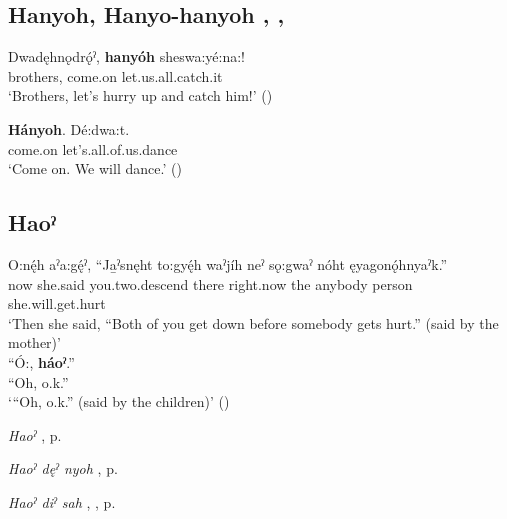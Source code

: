 \subsection*{\textbf{Hanyoh, Hanyo-hanyoh} , , } \label{p:[hanyoh]}

\ea
\label{ex:hpar100}
\gll Dwadęhnǫdrǫ́ˀ, \textbf{hanyóh} sheswa:yé:na:!\\
brothers, come.on let.us.all.catch.it\\
\glt ‘Brothers, let’s hurry up and catch him!’ (\cite{carrier_legends_2013})
\z


\ea
\label{ex:hpar2}
\gll \textbf{Hányoh}. Dé:dwa:t.\\
come.on let’s.all.of.us.dance\\
\glt ‘Come on. We will dance.’ (\cite{carrier_legends_2013})
\z


\subsection*{\textbf{Haoˀ} } \label{p:[haoˀ] ‘o.k.!’}

\ea
\label{ex:hpar3}
\gll O:nę́h aˀa:gę́ˀ, “Ja̱ˀsnęht to:gyę́h waˀjíh neˀ sǫ:gwaˀ nóht ęyagonǫ́hnyaˀk.”\\
now she.said you.two.descend there right.now the anybody person she.will.get.hurt\\
\glt ‘Then she said, “Both of you get down before somebody gets hurt.” (said by the mother)’\\
\gll “Ó:, \textbf{háoˀ}.”\\
“Oh, o.k.”\\
\glt ‘“Oh, o.k.” (said by the children)’ (\cite{henry_de_2005})
\z



\begin{CayugaRelated}
\item \textit{Haoˀ} , p. \pageref{p:[haoˀ] ‘come on!’}\\
\item \textit{Haoˀ dęˀ nyoh} , p. \pageref{p:[haoˀ dęˀ nyoh]}\\
\item \textit{Haoˀ diˀ sah} , , p. \pageref{p:[haoˀ diˀ sah]}
\end{CayugaRelated}

